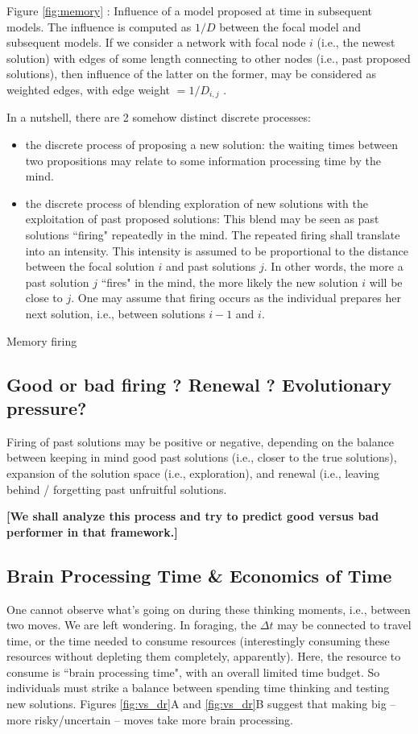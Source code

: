 Figure \ref{fig:memory} : Influence of a model proposed at time in subsequent models. The influence is computed as $1/D$ between the focal model and subsequent models. If we consider a network with focal node $i$ (i.e., the newest solution) with edges of some length connecting to other nodes (i.e., past proposed solutions), then influence of the latter on the former, may be considered as weighted edges, with edge weight $= 1/D_{i,j}$ .



In a nutshell, there are 2 somehow distinct discrete processes:

\begin{itemize}
  \item the discrete process of proposing a new solution: the waiting times between two propositions may relate to some information processing time by the mind.
  \item the discrete process of blending exploration of new solutions with the exploitation of past proposed solutions: This blend may be seen as past solutions ``firing" repeatedly in the mind. The repeated firing shall translate into an intensity. This intensity is assumed to be proportional to the distance between the focal solution $i$ and past solutions $j$. In other words, the more a past solution $j$ ``fires" in the mind, the more likely the new solution $i$ will be close to  $j$. One may assume that firing occurs as the individual prepares her next solution, i.e., between solutions $i-1$ and $i$. \end{itemize}

Memory firing 


\subsection{Good or bad firing ? Renewal ? Evolutionary pressure?}
Firing of past solutions may be positive or negative, depending on the balance between keeping in mind good past solutions (i.e., closer to the true solutions), expansion of the solution space (i.e., exploration), and renewal (i.e., leaving behind / forgetting past unfruitful solutions. 

{\bf [We shall analyze this process and try to predict good versus bad performer in that framework.]}


\subsection{Brain Processing Time \& Economics of Time}
One cannot observe what's going on during these thinking moments, i.e., between two moves. We are left wondering. In foraging, the $\Delta t$ may be connected to travel time, or the time needed to consume resources (interestingly consuming these resources without depleting them completely, apparently). Here, the resource to consume is ``brain processing time", with an overall limited time budget. So individuals must strike a balance between spending time thinking and testing new solutions.  Figures \ref{fig:vs_dr}A and \ref{fig:vs_dr}B suggest that making big -- more risky/uncertain -- moves take more brain processing. 

